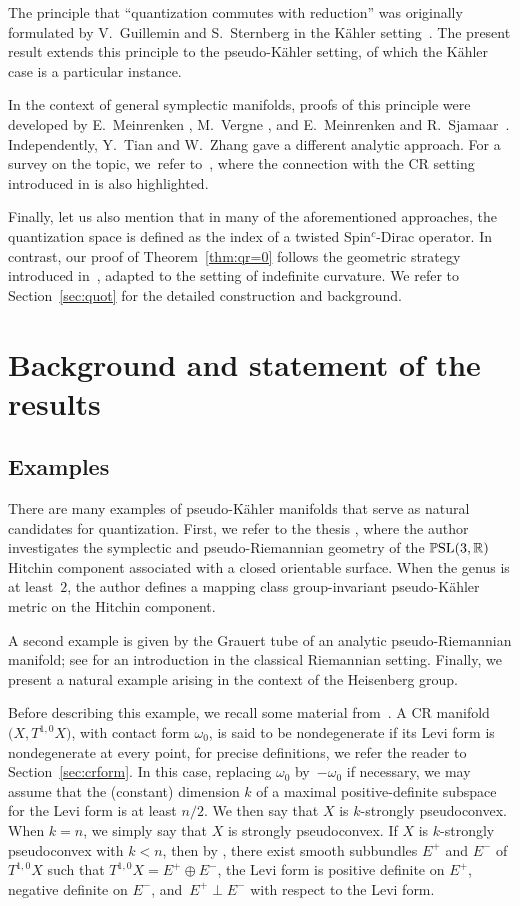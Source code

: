 \documentclass[pdftex]{sigma}
\numberwithin{equation}{section}
\begin{document}
The principle that ``quantization commutes with reduction'' was originally formulated by V.~Guillemin and S.~Sternberg in the K\"ahler setting~\cite{gs}. The present result extends this principle to the pseudo-K\"ahler setting, of which the K\"ahler case is a particular instance.
		
In the context of general symplectic manifolds, proofs of this principle were developed by E.~Meinrenken \cite{14}, M.~Vergne \cite{v,v-II}, and E.~Meinrenken and R.~Sjamaar~\cite{16}. Independently, Y.~Tian and W.~Zhang \cite{tz} gave a different analytic approach. For a survey on the topic, we~refer to~\cite{ma}, where the connection with the CR setting introduced in \cite{hmm} is also highlighted.
		
Finally, let us also mention that in many of the aforementioned approaches, the quantization space is defined as the index of a twisted Spin$^c$-Dirac operator. In contrast, our proof of Theorem~\ref{thm:qr=0} follows the geometric strategy introduced in~\cite{gs}, adapted to the setting of indefinite curvature. We refer to Section~\ref{sec:quot} for the detailed construction and background.

\section{Background and statement of the results}	 \label{sec:for}
	
\subsection{Examples}
	 There are many examples of pseudo-K\"ahler manifolds that serve as natural candidates for quantization. First, we refer to the thesis \cite{rungi}, where the author investigates the symplectic and pseudo-Riemannian geometry of the $\mathbb{P}{\rm SL}(3,\mathbb{R})$ Hitchin component associated with a closed orientable surface. When the genus is at least~$2$, the author defines a mapping class group-invariant pseudo-K\"ahler metric on the Hitchin component.
	
	 A second example is given by the Grauert tube of an analytic pseudo-Riemannian manifold; see \cite{z} for an introduction in the classical Riemannian setting. Finally, we present a natural example arising in the context of the Heisenberg group.
	
	 Before describing this example, we recall some material from~\cite{fs}. A CR manifold $\bigl(X, T^{1,0}X\bigr)$, with contact form $\omega_0$, is said to be nondegenerate if its Levi form is nondegenerate at every point, for precise definitions, we refer the reader to Section~\ref{sec:crform}. In this case, replacing $\omega_0$ by~$-\omega_0$ if necessary, we may assume that the (constant) dimension $k$ of a maximal positive-definite subspace for the Levi form is at least $n/2$. We then say that $X$ is $k$-strongly pseudoconvex. When $k = n$, we simply say that $X$ is strongly pseudoconvex. If $X$ is $k$-strongly pseudoconvex with $k < n$, then by \cite[Lemma 13.1]{fs}, there exist smooth subbundles $E^+$ and $E^-$ of $T^{1,0}X$ such that $T^{1,0}X=E^+\oplus E^-$, the Levi form is positive definite on $E^+$, negative definite on $E^-$, and~${E^+ \perp E^-}$ with respect to the Levi form.
	
\end{document}
